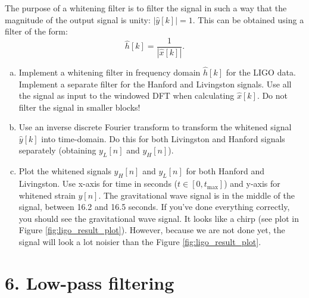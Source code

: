 The purpose of a whitening filter is to filter the signal in such a way that the
magnitude of the output signal is unity: $|\hat{y}[k]|=1$. This can be  obtained using a filter of the form:
\begin{equation}
  \hat{h}[k]=\frac{1}{|\hat{x}[k]|}.
  \label{wfilt}
\end{equation}
\begin{enumerate}[a)]



  \item Implement a whitening filter in frequency domain $\hat{h}[k]$
        for the LIGO data. Implement a separate filter for the Hanford and
        Livingston signals. Use all the signal as input to the windowed
        DFT when calculating $\hat{x}[k]$. Do not filter the signal in
        smaller blocks!

  \item Use an inverse discrete Fourier transform to transform the
        whitened signal $\hat{y}[k]$ into time-domain. Do this for both
        Livingston and Hanford signals separately (obtaining $y_L[n]$ and
        $y_H[n]$).

  \item Plot the whitened signals $y_H[n]$ and $y_L[n]$ for both
    Hanford and Livingston. Use x-axis for time in seconds
    ($t\in[0,t_{\mathrm{max}}]$) and y-axis for whitened strain
    $y[n]$. The gravitational wave signal is in the middle of the
    signal, between 16.2 and 16.5 seconds. If you've done everything
    correctly, you should see the gravitational wave signal. It looks
    like a chirp (see plot in Figure \ref{fig:ligo_result_plot}).
    However, because we are not done yet, the signal will look a lot
    noisier than the Figure \ref{fig:ligo_result_plot}.

\end{enumerate}

\section{6. Low-pass filtering}

